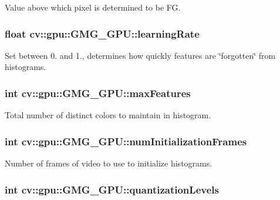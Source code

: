 Value above which pixel is determined to be F\-G. 

\hypertarget{classcv_1_1gpu_1_1GMG__GPU_a05dad91a91ad2a893a79f0b95920e24c}{
\subsubsection[{learning\-Rate}]{\setlength{\rightskip}{0pt plus 5cm}float cv\-::gpu\-::\-G\-M\-G\-\_\-\-G\-P\-U\-::learning\-Rate}}\label{classcv_1_1gpu_1_1GMG__GPU_a05dad91a91ad2a893a79f0b95920e24c}


Set between 0. and 1., determines how quickly features are \char`\"{}forgotten\char`\"{} from histograms. 

\hypertarget{classcv_1_1gpu_1_1GMG__GPU_aef13a3000e96aea8f8599e933e0b0492}{
\subsubsection[{max\-Features}]{\setlength{\rightskip}{0pt plus 5cm}int cv\-::gpu\-::\-G\-M\-G\-\_\-\-G\-P\-U\-::max\-Features}}\label{classcv_1_1gpu_1_1GMG__GPU_aef13a3000e96aea8f8599e933e0b0492}


Total number of distinct colors to maintain in histogram. 

\hypertarget{classcv_1_1gpu_1_1GMG__GPU_ab4796b2f60da0a859dd242ec5681ea43}{
\subsubsection[{num\-Initialization\-Frames}]{\setlength{\rightskip}{0pt plus 5cm}int cv\-::gpu\-::\-G\-M\-G\-\_\-\-G\-P\-U\-::num\-Initialization\-Frames}}\label{classcv_1_1gpu_1_1GMG__GPU_ab4796b2f60da0a859dd242ec5681ea43}


Number of frames of video to use to initialize histograms. 

\hypertarget{classcv_1_1gpu_1_1GMG__GPU_a562b4ad84c3c15f6c952e26304a854f1}{
\subsubsection[{quantization\-Levels}]{\setlength{\rightskip}{0pt plus 5cm}int cv\-::gpu\-::\-G\-M\-G\-\_\-\-G\-P\-U\-::quantization\-Levels}}\label{classcv_1_1gpu_1_1GMG__GPU_a562b4ad84c3c15f6c952e26304a854f1}


